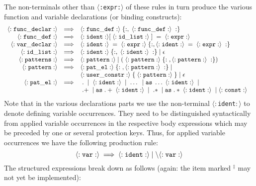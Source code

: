 The non-terminals other than {\tt $\langle$:expr:$\rangle$} of these
 rules in turn produce
 the various {\mys function} and {\mys variable declarations} (or
binding constructs):
$$
\begin{array}{rcl}
{\tt \langle:func\_declar:\rangle} & \Longrightarrow & {\tt \langle:func\_def:\rangle\;
\{:,\;\langle:func\_def:\rangle\;:\}}  \; \\
{\tt \langle:func\_def:\rangle} & \Longrightarrow & {\tt \langle:ident:\rangle[\;\langle:id\_list:\rangle\;]\;=\;\langle:expr:\rangle}  \; \\
{\tt \langle:var\_declar:\rangle} & \Longrightarrow & {\tt \langle:ident:\rangle\;=\;\langle:expr:\rangle\;\{:, \langle:ident:\rangle\;=\;\langle:expr:\rangle\;:\}}  \; \\
{\tt \langle:id\_list:\rangle} & \Longrightarrow & {\tt \langle:ident:\rangle\;\{:,\; \langle:ident:\rangle\;:\}\; | \; \epsilon} \; \\
{\tt \langle:patterns:\rangle} & \Longrightarrow & {\tt \langle:pattern:\rangle \; | \;  
(\; \langle:pattern:\rangle\;\{:\;, \langle:pattern:\rangle\;:\})}  \;\\
{\tt \langle:pattern:\rangle} & \Longrightarrow & {\tt \langle:pat\_el:\rangle\;\{:\;, \langle:pattern:\rangle\;:\}} \; |\\
 & & {\tt \langle:user\_constr:\rangle\;\{\;\langle:pattern:\rangle\;\} \; | \; \epsilon}\; \\
{\tt \langle:pat\_el:\rangle} & \Longrightarrow & {\tt \;.\; \; | \; \;\langle:ident:\rangle\;} \;|\; 
 {\tt \;\ldots\; \; | \;  as\;\ldots\; \langle:ident:\rangle\;} \; |\\
& & {\tt \;.+\;} \; | \; {\tt as\;.+\;\langle:ident:\rangle\;} \; |\;
{\tt \;.*\;} \; | \; {\tt as\;.*\;\langle:ident:\rangle\;} \; |\;
{\tt \langle:const:\rangle} \; \; 
\end{array}
$$
 Note that in the various declarations parts we use the non-terminal
{\tt $\langle:$ident$:\rangle$} to denote defining variable occurrences.
They need to be distinguished syntactically
from applied variable occurrences in the
respective body expressions which may be preceded by one or several
protection keys. Thus, for applied variable occurrences
 we have the following production rule:
$$
{\tt \langle:var:\rangle\;\Longrightarrow\;\langle:ident:\rangle\;|\;\backslash \langle:var:\rangle}
$$
The structured expressions break down as follows (again: the item marked $^\ddagger$
 may not yet be implemented):
